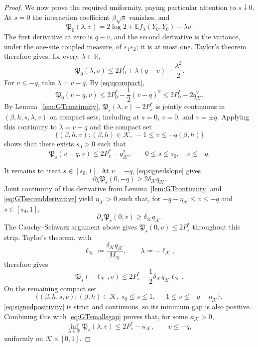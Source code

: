 \documentclass[11pt]{article}
\numberwithin{equation}{section}
\newcommand{\E}{\mathbb{E}}
\newcommand{\1}{\mathbf 1}
\newcommand{\cK}{\mathcal K}
\begin{document}
\begin{proof}
We now prove the required uniformity, paying particular attention to
$s\downarrow0$.  At $s=0$ the interaction coefficient
$\beta\sqrt{s}$ vanishes, and
\[
 \mathfrak P_0(\lambda,v)
 =2\log2+\E f_\lambda(Y_0,Y_0)-\lambda v.
\]
The first derivative at zero is $q-v$, and the second derivative is
the variance, under the one-site coupled measure, of
$\varepsilon_1\varepsilon_2$; it is at most one.  Taylor's theorem
therefore gives, for every $\lambda\in\mathbb R$,
\begin{equation}
 \mathfrak P_0(\lambda,v)
 \le2P_0^*+\lambda(q-v)+\frac{\lambda^2}{2}.
 \label{eq:GTendpoint}
\end{equation}
For $v\le-q$, take $\lambda=v-q$.  By \eqref{eq:qcompact},
\begin{equation}
 \mathfrak P_0(v-q,v)
 \le2P_0^*-\frac12(v-q)^2
 \le2P_0^*-2q_{\cK}^2.
 \label{eq:GTsmallsgapzero}
\end{equation}
By Lemma~\ref{lem:GTcontinuity},
$\mathfrak P_s(\lambda,v)-2P_s^*$ is jointly continuous in
$(\beta,h,s,\lambda,v)$ on compact sets, including at $s=0$, $v=0$,
and $v=\pm q$.  Applying this continuity to
$\lambda=v-q$ and the compact set
\[
 \{(\beta,h,v):(\beta,h)\in\cK,\ -1\le v\le-q(\beta,h)\}
\]
shows that there exists $s_0>0$ such that
\begin{equation}
 \mathfrak P_s(v-q,v)\le2P_s^*-q_{\cK}^2,
 \qquad 0\le s\le s_0,\quad v\le-q.
 \label{eq:GTsmallsgap}
\end{equation}

It remains to treat $s\in[s_0,1]$.  At $v=-q$,
\eqref{eq:signedslope} gives
\[
 \partial_\lambda\mathfrak P_s(0,-q)
 \ge2\delta_{\cK}q_{\cK}.
\]
Joint continuity of this derivative from Lemma~\ref{lem:GTcontinuity} and
\eqref{eq:GTsecondderivative} yield $\eta_{\cK}>0$ such that, for
$-q-\eta_{\cK}\le v\le-q$ and $s\in[s_0,1]$,
\[
 \partial_\lambda\mathfrak P_s(0,v)
 \ge\delta_{\cK}q_{\cK}.
\]
The Cauchy--Schwarz argument above gives
$\mathfrak P_s(0,v)\le2P_s^*$ throughout this strip.  Taylor's theorem,
with
\[
 \ell_{\cK}\coloneqq
 \frac{\delta_{\cK}q_{\cK}}{M_{\cK}},
 \qquad\lambda\coloneqq-\ell_{\cK},
\]
therefore gives
\[
 \mathfrak P_s(-\ell_{\cK},v)
 \le2P_s^*-\frac12\delta_{\cK}q_{\cK}\ell_{\cK}.
\]
On the remaining compact set
\[
 \{(\beta,h,s,v):(\beta,h)\in\cK,\ s_0\le s\le1,\
                 -1\le v\le-q-\eta_{\cK}\},
\]
\eqref{eq:signedpositivity} is strict and continuous, so its minimum
gap is also positive.  Combining this with
\eqref{eq:GTsmallsgap} proves that, for some
$\kappa_{\cK}>0$,
\begin{equation}
 \inf_{\lambda\in\mathbb R}\mathfrak P_s(\lambda,v)
 \le2P_s^*-\kappa_{\cK},\qquad v\le-q,
 \label{eq:GTuniformnegativegap}
\end{equation}
uniformly on $\cK\times[0,1]$.


\end{proof}
\end{document}
